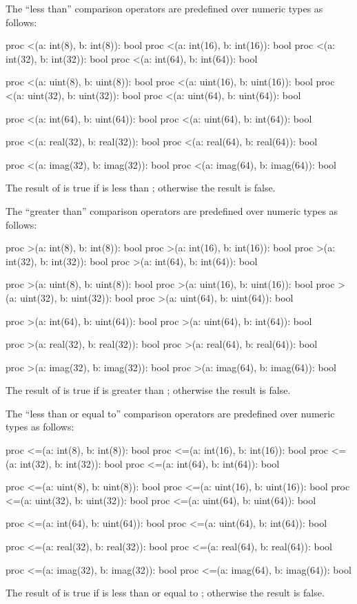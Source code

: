 The ``less than'' comparison operators are predefined over numeric
types as follows:
\begin{chapel}
proc <(a: int(8), b: int(8)): bool
proc <(a: int(16), b: int(16)): bool
proc <(a: int(32), b: int(32)): bool
proc <(a: int(64), b: int(64)): bool

proc <(a: uint(8), b: uint(8)): bool
proc <(a: uint(16), b: uint(16)): bool
proc <(a: uint(32), b: uint(32)): bool
proc <(a: uint(64), b: uint(64)): bool

proc <(a: int(64), b: uint(64)): bool
proc <(a: uint(64), b: int(64)): bool

proc <(a: real(32), b: real(32)): bool
proc <(a: real(64), b: real(64)): bool

proc <(a: imag(32), b: imag(32)): bool
proc <(a: imag(64), b: imag(64)): bool
\end{chapel}
The result of  is true if  is less than ;
otherwise the result is false.

The ``greater than'' comparison operators are predefined over numeric
types as follows:
\begin{chapel}
proc >(a: int(8), b: int(8)): bool
proc >(a: int(16), b: int(16)): bool
proc >(a: int(32), b: int(32)): bool
proc >(a: int(64), b: int(64)): bool

proc >(a: uint(8), b: uint(8)): bool
proc >(a: uint(16), b: uint(16)): bool
proc >(a: uint(32), b: uint(32)): bool
proc >(a: uint(64), b: uint(64)): bool

proc >(a: int(64), b: uint(64)): bool
proc >(a: uint(64), b: int(64)): bool

proc >(a: real(32), b: real(32)): bool
proc >(a: real(64), b: real(64)): bool

proc >(a: imag(32), b: imag(32)): bool
proc >(a: imag(64), b: imag(64)): bool
\end{chapel}
The result of  is true if  is greater
than ; otherwise the result is false.

The ``less than or equal to'' comparison operators are predefined over
numeric types as follows:
\begin{chapel}
proc <=(a: int(8), b: int(8)): bool
proc <=(a: int(16), b: int(16)): bool
proc <=(a: int(32), b: int(32)): bool
proc <=(a: int(64), b: int(64)): bool

proc <=(a: uint(8), b: uint(8)): bool
proc <=(a: uint(16), b: uint(16)): bool
proc <=(a: uint(32), b: uint(32)): bool
proc <=(a: uint(64), b: uint(64)): bool

proc <=(a: int(64), b: uint(64)): bool
proc <=(a: uint(64), b: int(64)): bool

proc <=(a: real(32), b: real(32)): bool
proc <=(a: real(64), b: real(64)): bool

proc <=(a: imag(32), b: imag(32)): bool
proc <=(a: imag(64), b: imag(64)): bool
\end{chapel}
The result of  is true if  is less than or equal
to ; otherwise the result is false.

